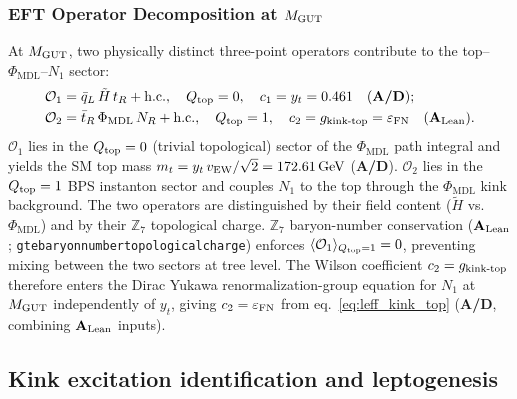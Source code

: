 \documentclass[11pt]{article}
\theoremstyle{remark}
\newcommand{\PHIMDL}{\Phi_{\mathrm{MDL}}}
\newcommand{\ZS}{\mathbb{Z}_7}
\newcommand{\lean}[1]{%
  \penalty-100
  \begingroup\def\_{\textunderscore\allowbreak}\texttt{#1}\endgroup}
\newcommand{\CatAL}{\ensuremath{\textbf{A}_{\rm Lean}}}
\newcommand{\CatAD}{\textbf{A/D}}
\begin{document}
\subsubsection{EFT Operator Decomposition at $M_{\rm GUT}$}
\label{sssec:eft_operators}

At $M_{\rm GUT}$, two physically distinct three-point operators contribute to the
top--$\PHIMDL$--$N_1$ sector:
\begin{align}
  \mathcal{O}_1 &= \bar{q}_L\,\tilde{H}\,t_R + \text{h.c.},
    \quad Q_{\rm top} = 0,\quad c_1 = y_t = 0.461 \quad (\CatAD); \label{eq:O1}\\
  \mathcal{O}_2 &= \bar{t}_R\,\PHIMDL\,N_R + \text{h.c.},
    \quad Q_{\rm top} = 1,\quad
    c_2 = g_{\rm kink\text{-}top} = \varepsilon_{\rm FN} \quad (\CatAL). \label{eq:O2}
\end{align}
$\mathcal{O}_1$ lies in the $Q_{\rm top}=0$ (trivial topological) sector of the
$\PHIMDL$ path integral and yields the SM top mass
$m_t = y_t\,v_{\rm EW}/\sqrt{2} = 172.61\,\text{GeV}$ (\CatAD).
$\mathcal{O}_2$ lies in the $Q_{\rm top}=1$ BPS instanton sector and couples $N_1$
to the top through the $\PHIMDL$ kink background.
The two operators are distinguished by their field content ($\tilde{H}$ vs.\ $\PHIMDL$)
and by their $\ZS$ topological charge.
$\ZS$ baryon-number conservation
(\CatAL; \lean{gte\_baryon\_number\_topological\_charge})
enforces $\langle\mathcal{O}_1\rangle_{Q_{\rm top}=1} = 0$, preventing mixing
between the two sectors at tree level.
The Wilson coefficient $c_2 = g_{\rm kink\text{-}top}$ therefore enters the Dirac
Yukawa renormalization-group equation for $N_1$ at $M_{\rm GUT}$ independently
of $y_t$, giving $c_2 = \varepsilon_{\rm FN}$ from eq.~\eqref{eq:leff_kink_top}
(\CatAD, combining \CatAL{} inputs).

\subsection{Kink excitation identification and leptogenesis}
\label{ssec:kink_leptogenesis}
\end{document}
